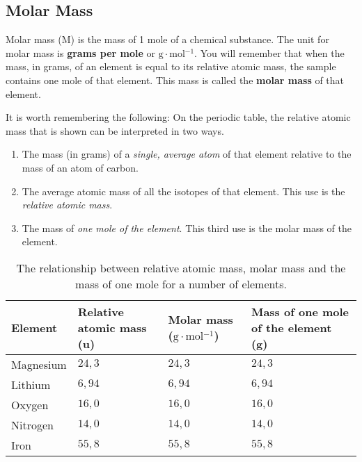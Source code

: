             \subsection*{Molar Mass}
            \nopagebreak
            \label{m38717*fhsst!!!underscore!!!id147}
 {Molar mass (M) is the mass of 1 mole of a chemical substance. The unit for molar mass is \textbf{grams per mole} or $\text{g} \cdot \text{mol}{}^{-1}$. } 
      \label{m38717*id276429}You will remember that when the mass, in grams, of an element is equal to its relative atomic mass, the sample contains one mole of that element. This mass is called the \textbf{molar mass} of that element.\par 
{} \label{m38717*id276445}It is worth remembering the following: On the periodic table, the relative atomic mass that is shown can be interpreted in two ways.
\begin{enumerate}[noitemsep, label=\textbf{\arabic*}. ] 
\item The mass (in grams) of a \textsl{single, average atom} of that element relative to the mass of an atom of carbon.
\item The average atomic mass of all the isotopes of that element. This use is the \textsl{relative atomic mass}.
\item The mass of \textsl{one mole of the element}. This third use is the molar mass of the element.
\end{enumerate}
          \begin{table}[H]
        \begin{center}
      \label{m38717*uid11}
    \noindent
      \begin{tabular}{|l|l|l|p{3cm}|}\hline
                \textbf{Element}
               &
                \textbf{Relative atomic mass (u)}
               &
                \textbf{Molar mass ($\text{g} \cdot \text{mol}{}^{-1}$)}
               &
                \textbf{Mass of one mole of the element (g)} \\ \hline
        Magnesium &
        $24,3$ &
        $24,3$ &
        $24,3$ \\ \hline
        Lithium &
        $6,94$ &
        $6,94$ &
        $6,94$ \\ \hline
        Oxygen &
        $16,0$ &
        $16,0$ &
        $16,0$ \\ \hline
        Nitrogen &
        $14,0$ &
        $14,0$ &
        $14,0$  \\ \hline
        Iron &
        $55,8$ &
        $55,8$ &
        $55,8$ \\ \hline
    \end{tabular}
      \end{center}
    \caption{The relationship between relative atomic mass, molar mass and the mass of one mole for a number of elements.}
\end{table}

